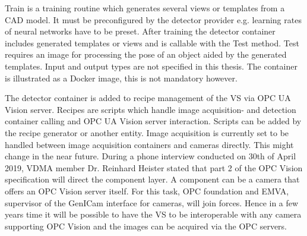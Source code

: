Train is a training routine which generates several views or templates from a CAD model. It must be preconfigured by the detector provider e.g. learning rates of neural networks have to be preset. After training the detector container includes generated templates or views and is callable with the Test method.  Test requires an image for processing the pose of an object aided by the generated templates.  Input and output types are not specified in this thesis. The container is illustrated as a Docker image, this is not mandatory however.

The detector container is added to recipe management of the VS via OPC UA Vision server. Recipes are scripts which handle image acquisition- and detection container calling and OPC UA Vision server interaction. Scripts can be added by the recipe generator or another entity. Image acquisition is currently set to be handled between image acquisition containers and cameras directly. This might change in the near future. During a phone interview conducted on 30th of April 2019, VDMA member Dr. Reinhard Heister stated that part 2 of the OPC Vision specification will direct the component layer. A component can be a camera that offers an OPC Vision server itself. For this task, OPC foundation and EMVA, supervisor of the GenICam interface \cite{LastvisitedMay4th20192019GenICamStandard} for cameras, will join forces. Hence in a few years time it will be possible to have the VS to be interoperable with any camera supporting OPC Vision and the images can be acquired via the OPC servers.


